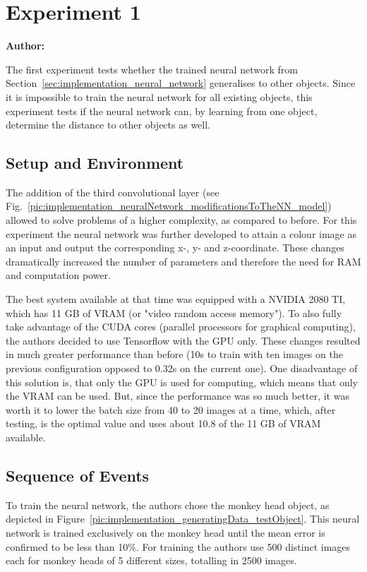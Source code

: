 \chapter{Experiment 1}
\label{cap:experiment1}

\textbf{Author: } 

The first experiment tests whether the trained neural network from Section~\ref{sec:implementation_neural_network} generalises to other objects. Since it is impossible to train the neural network for all existing objects, this experiment tests if the neural network can, by learning from one object, determine the distance to other objects as well.

\section{Setup and Environment}
The addition of the third convolutional layer (see Fig.~\ref{pic:implementation_neuralNetwork_modificationsToTheNN_model}) allowed to solve problems of a higher complexity, as compared to before. For this experiment the neural network was further developed to attain a colour image as an input and output the corresponding x-, y- and z-coordinate. These changes dramatically increased the number of parameters and therefore the need for RAM and computation power. 

The best system available at that time was equipped with a NVIDIA 2080 TI, which has 11 GB of VRAM (or "video random access memory"). To also fully take advantage of the CUDA cores (parallel processors for graphical computing), the authors decided to use Tensorflow with the GPU only. These changes resulted in much greater performance than before (10s to train with ten images on the previous configuration opposed to 0.32s on the current one). One disadvantage of this solution is, that only the GPU is used for computing, which means that only the VRAM can be used. But, since the performance was so much better, it was worth it to lower the batch size from 40 to 20 images at a time, which, after testing, is the optimal value and uses about 10.8 of the 11 GB of VRAM available.

\section{Sequence of Events}
To train the neural network, the authors chose the monkey head object, as depicted in Figure~\ref{pic:implementation_generatingData_testObject}. This neural network is trained exclusively on the monkey head until the mean error is confirmed to be less than 10\%. For training the authors use 500 distinct images each for monkey heads of 5 different sizes, totalling in 2500 images.

